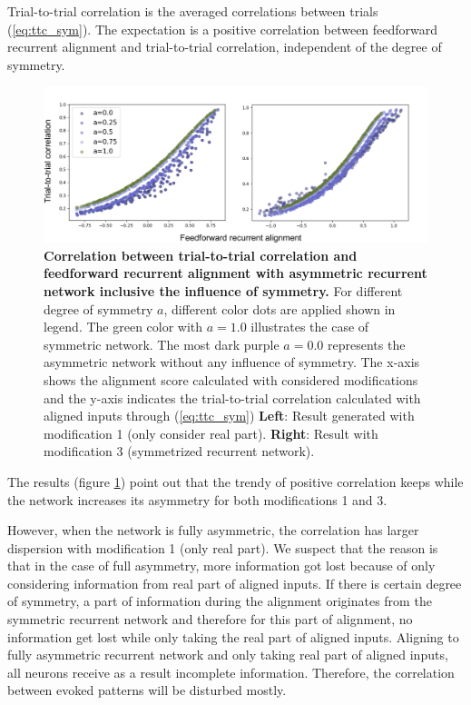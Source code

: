 \documentclass[11pt]{article}
\begin{document}
	Trial-to-trial correlation is the averaged correlations between trials (\ref{eq:ttc_sym}). The expectation is a positive correlation between feedforward recurrent alignment and trial-to-trial correlation, independent of the degree of symmetry. 
		\begin{figure}[H]
			\centering
			\includegraphics[width = \textwidth]{../figures/ttc_asym.pdf}
			\caption{\textbf{Correlation between trial-to-trial correlation and feedforward recurrent alignment with asymmetric recurrent network inclusive the influence of symmetry.} For different degree of symmetry $a$, different color dots are applied shown in legend. The green color with $a=1.0$ illustrates the case of symmetric network. The most dark purple $a=0.0$ represents the asymmetric network without any influence of symmetry. The x-axis shows the alignment score calculated with considered modifications and the y-axis indicates the trial-to-trial correlation calculated with aligned inputs through (\ref{eq:ttc_sym}) \textbf{Left}: Result generated with modification 1 (only consider real part). \textbf{Right}: Result with modification 3 (symmetrized recurrent network).}
			\label{fig:ttc_asym}
		\end{figure}
	The results (figure \ref{fig:ttc_asym}) point out that the trendy of positive correlation keeps while the network increases its asymmetry for both modifications 1 and 3. 
	
	However, when the network is fully asymmetric, the correlation has larger dispersion with modification 1 (only real part). We suspect that the reason is that in the case of full asymmetry, more information got lost because of only considering information from real part of aligned inputs. If there is certain degree of symmetry, a part of information during the alignment originates from the symmetric recurrent network and therefore for this part of alignment, no information get lost while only taking the real part of aligned inputs. Aligning to fully asymmetric recurrent network and only taking real part of aligned inputs, all neurons receive as a result incomplete information. Therefore, the correlation between evoked patterns will be disturbed mostly. 
	
\end{document}
